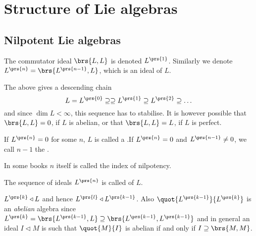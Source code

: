 \documentclass[10pt,a4paper,twoside,openany,hidelinks]{book}
\begin{document}
\chapter{Structure of Lie algebras}
\section{Nilpotent Lie algebras}
\begin{definition}
The commutator ideal $\brs{L,L}$ is denoted $L^{\prs{1}}$.
Similarly we denote $L^{\prs{n}} = \brs{L^{\prs{n-1}},L}$, which is an ideal of $L$.
\end{definition}
\begin{remark}
The above gives a descending chain
\[L = L^{\prs{0}} \supseteq \supseteq L^{\prs{1}} \supseteq L^{\prs{2}} \supseteq \ldots\]
and since $\dim L < \infty$, this sequence has to stabilise.
It is however possible that $\brs{L,L}=0$, if $L$ is abelian, or that $\brs{L,L} = L$, if $L$ is perfect.
\end{remark}
\begin{definition}
If $L^{\prs{n}} = 0$ for some $n$, $L$ is called a 
.If $L^{\prs{n}} = 0$ and $L^{\prs{n-1}} \neq 0$, we call $n-1$ the .
\end{definition}
\begin{note}
In some books $n$ itself is called the index of nilpotency.
\end{note}
\begin{definition}
The sequence of ideals $L^{\prs{n}}$ is called  of $L$.
\end{definition}
\begin{remark}
$L^{\prs{k}} \triangleleft L$ and hence $L^{\prs{l}} \triangleleft L^{\prs{k-1}}$. Also $\quot{L^{\prs{k-1}}}{L^{\prs{k}}}$ is an \emph{abelian} algebra
since $L^{\prs{k}} = \brs{L^{\prs{k-1}}, L} \supseteq \brs{L^{\prs{k-1}}, L^{\prs{k-1}}}$ and in general an ideal $I \triangleleft M$ is such that $\quot{M}{I}$ is abelian if and only if $I \supseteq \brs{M,M}$.
\end{remark}
\backmatter
\end{document}
